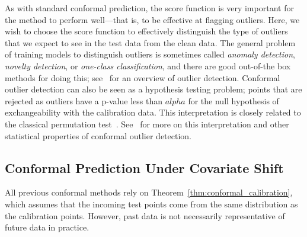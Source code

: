 \documentclass[10pt]{article}
\begin{document}
As with standard conformal prediction, the score function is very important for
the method to perform well---that is, to be effective at flagging outliers. 
Here, we wish to 
choose the score function to effectively distinguish the type of outliers that we expect
to see in the test data from the clean data. 
The general problem of training models
to distinguish outliers is sometimes called \emph{anomaly detection}, \emph{novelty detection}, or \emph{one-class classification}, and there are good out-of-the box methods for doing this; see~\cite{pimental2014review}
for an overview of outlier detection.
Conformal outlier detection can also be seen as a hypothesis testing problem; points that are rejected as outliers have a p-value less than $alpha$ for the null hypothesis of exchangeability with the calibration data.
This interpretation is closely related to the classical permutation test~\cite{fisher1936design,pitman1937significance}.
See~\cite{vovk2003testing, guan2019prediction, bates2021multiple}
for more on this interpretation and other statistical properties of conformal outlier detection.

\subsection{Conformal Prediction Under Covariate Shift}
All previous conformal methods rely on Theorem~\ref{thm:conformal_calibration}, which assumes that the incoming test points come from the same distribution as the calibration points.
However, past data is not necessarily representative of future data in practice.
\end{document}
